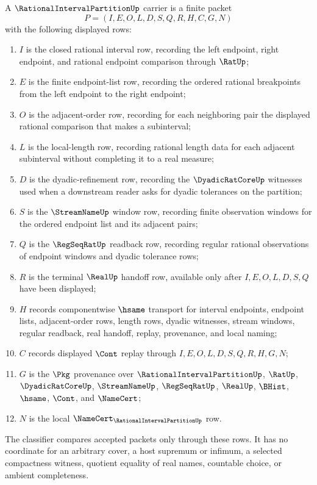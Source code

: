 \begin{definition}
\label{def:rational-interval-partition-carrier}
A $\RationalIntervalPartitionUp$ carrier is a finite packet
$$
P=(I,E,O,L,D,S,Q,R,H,C,G,N)
$$
with the following displayed rows:
\begin{enumerate}
\item $I$ is the closed rational interval row, recording the left endpoint, right endpoint, and rational endpoint comparison through $\RatUp$;
\item $E$ is the finite endpoint-list row, recording the ordered rational breakpoints from the left endpoint to the right endpoint;
\item $O$ is the adjacent-order row, recording for each neighboring pair the displayed rational comparison that makes a subinterval;
\item $L$ is the local-length row, recording rational length data for each adjacent subinterval without completing it to a real measure;
\item $D$ is the dyadic-refinement row, recording the $\DyadicRatCoreUp$ witnesses used when a downstream reader asks for dyadic tolerances on the partition;
\item $S$ is the $\StreamNameUp$ window row, recording finite observation windows for the ordered endpoint list and its adjacent pairs;
\item $Q$ is the $\RegSeqRatUp$ readback row, recording regular rational observations of endpoint windows and dyadic tolerance rows;
\item $R$ is the terminal $\RealUp$ handoff row, available only after $I,E,O,L,D,S,Q$ have been displayed;
\item $H$ records componentwise $\hsame$ transport for interval endpoints, endpoint lists, adjacent-order rows, length rows, dyadic witnesses, stream windows, regular readback, real handoff, replay, provenance, and local naming;
\item $C$ records displayed $\Cont$ replay through $I,E,O,L,D,S,Q,R,H,G,N$;
\item $G$ is the $\Pkg$ provenance over $\RationalIntervalPartitionUp$, $\RatUp$, $\DyadicRatCoreUp$, $\StreamNameUp$, $\RegSeqRatUp$, $\RealUp$, $\BHist$, $\hsame$, $\Cont$, and $\NameCert$;
\item $N$ is the local $\NameCert_{\RationalIntervalPartitionUp}$ row.
\end{enumerate}
The classifier compares accepted packets only through these rows. It has no coordinate for an arbitrary cover, a host supremum or infimum, a selected compactness witness, quotient equality of real names, countable choice, or ambient completeness.
\end{definition}

